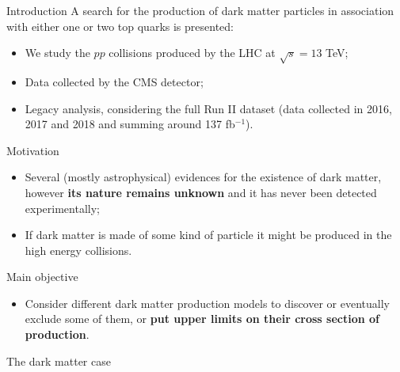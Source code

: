 \documentclass[8pt]{beamer}
\begin{document}
\begin{frame}{Introduction}
\justifying
A search for the \alert{production of dark matter particles in association with either one or two top quarks} is presented:

\vspace{-5pt}
\begin{itemize}
\justifying
\item We study the $pp$ collisions produced by the LHC at $\sqrt{s} = 13$ TeV;
\item Data collected by the CMS detector;
\item Legacy analysis, considering the full Run II dataset (data collected in 2016, 2017 and 2018 and summing around 137 fb$^{-1}$).
\end{itemize} \vfill

\begin{block}{\centering Motivation}\end{block}
\vspace{-5pt}
\begin{itemize}
\justifying
\item Several (mostly astrophysical) evidences for the existence of dark matter, however \textbf{its nature remains unknown} and it has never been detected experimentally;
\item If dark matter is made of some kind of particle it might be produced in the high energy collisions.
\end{itemize} \vfill

\begin{block}{ \centering Main objective}\end{block}
\vspace{-5pt}
\begin{itemize}
\justifying
\item Consider different dark matter production models to discover or eventually exclude some of them, or \textbf{put upper limits on their cross section of production}.
\end{itemize} \vfill
\end{frame}








\begin{frame}[standout]
The dark matter case
\end{frame}
\end{document}
